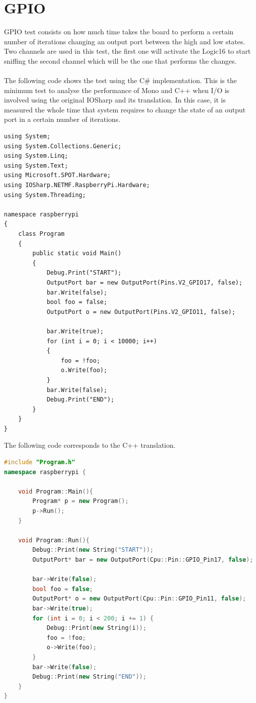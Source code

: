 \section{GPIO}\label{SS:IOEx-GPIO}
GPIO test consists on how much time takes the board to perform a certain number of iterations changing an output port between the high and low states. Two channels are used in this test, the first one will activate the Logic16 to start sniffing the second channel which will be the one that performs the changes. 
\\
\\
The following code shows the test using the C\# implementation. This is the minimum test to analyse the performance of Mono and C++ when I/O is involved using the original IOSharp and its translation. In this case, it is measured the whole time that system requires to change the state of an output port in a certain number of iterations.
\begin{lstlisting}[language=CSharp, caption={GPIO Performance test in C\#}]
using System;
using System.Collections.Generic;
using System.Linq;
using System.Text;
using Microsoft.SPOT.Hardware;
using IOSharp.NETMF.RaspberryPi.Hardware;
using System.Threading;

namespace raspberrypi
{
    class Program
    {
        public static void Main()
        {
            Debug.Print("START");
            OutputPort bar = new OutputPort(Pins.V2_GPIO17, false);
            bar.Write(false);
            bool foo = false;
            OutputPort o = new OutputPort(Pins.V2_GPIO11, false);

            bar.Write(true);
            for (int i = 0; i < 10000; i++)
            {
                foo = !foo;
                o.Write(foo);
            }
            bar.Write(false);
            Debug.Print("END");
        }
    }
}
\end{lstlisting}
The following code corresponds to the C++ translation.
\begin{lstlisting}[language=C++, caption={GPIO Performance translated to C++}]
#include "Program.h"
namespace raspberrypi {

	void Program::Main(){
		Program* p = new Program();
		p->Run();
	}

	void Program::Run(){
		Debug::Print(new String("START"));
		OutputPort* bar = new OutputPort(Cpu::Pin::GPIO_Pin17, false);
	
		bar->Write(false);
		bool foo = false;
		OutputPort* o = new OutputPort(Cpu::Pin::GPIO_Pin11, false);
		bar->Write(true);
		for (int i = 0; i < 200; i += 1) {
			Debug::Print(new String(i));
			foo = !foo;
			o->Write(foo);
		}
		bar->Write(false);
		Debug::Print(new String("END"));
	}
}
\end{lstlisting}

